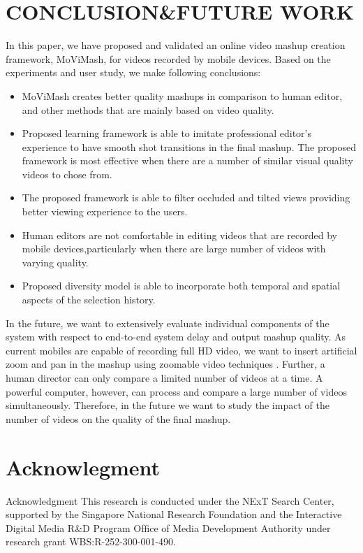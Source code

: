 \documentclass{sig-alternate}
\begin{document}
\section{CONCLUSION\&FUTURE WORK}
In this paper, we have proposed and validated an online video mashup creation framework, MoViMash, for videos recorded by mobile devices. Based on the experiments and user study, we make following conclusions: 
\begin{itemize}
\item MoViMash creates better quality mashups in comparison to human editor, and other methods that are mainly based on video quality.
 \item Proposed learning framework is able to imitate professional editor’s experience to have smooth shot transitions in the ﬁnal mashup. The proposed framework is most effective when there are a number of similar visual quality videos to chose from. 
\item The proposed framework is able to ﬁlter occluded and tilted views providing better viewing experience to the users. 
\item Human editors are not comfortable in editing videos that are recorded by mobile devices,particularly when there are large number of videos with varying quality. 
\item Proposed diversity model is able to incorporate both temporal and spatial aspects of the selection history.
\end{itemize}
In the future, we want to extensively evaluate individual components of the system with respect to end-to-end system delay and output mashup quality. As current mobiles are capable of recording full HD video, we want to insert artiﬁcial zoom and pan in the mashup using zoomable video techniques \cite{saini2012movimash}. Further, a human director can only compare a limited number of videos at a time. A powerful computer, however, can process and compare a large number of videos simultaneously. Therefore, in the future we want to study the impact of the number of videos on \cite{saini2012movimash} the quality of the ﬁnal mashup.

\section*{Acknowlegment}
Acknowledgment This research is conducted under the NExT Search Center, supported by the Singapore National Research Foundation and the Interactive \cite{saini2012movimash} Digital Media R\&D Program Ofﬁce of Media Development Authority under research grant WBS:R-252-300-001-490.








%

\end{document}
